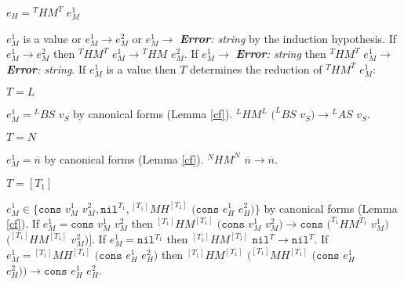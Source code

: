 \begin{case}

$e_{H}={^{T}H}M^{T}$ $e_{M}^{1}$

$e_{M}^{1}$ is a value or $e_{M}^{1}\rightarrow e_{M}^{2}$ or $e_{M}^{1}\rightarrow$ \emph{\textbf{Error}: string} by the induction hypothesis.  If $e_{M}^{1}\rightarrow e_{M}^{2}$ then $^{T}HM^{T}$ $e_{M}^{1}\rightarrow{^{T}H}M$ $e_{M}^{2}$.  If $e_{M}^{1}\rightarrow$ \emph{\textbf{Error}: string} then $^{T}HM^{T}$ $e_{M}^{1}\rightarrow$ \emph{\textbf{Error}: string}.  If $e_{M}^{1}$ is a value then $T$ determines the reduction of $^{T}HM^{T}$ $e_{M}^{1}$:

\begin{subcase}

$T=L$

$e_{M}^{1}={^{L}B}S$ $v_{S}$ by canonical forms (Lemma \ref{cf}).  $^{L}HM^{L}$ $(^{L}BS$ $v_{S})\rightarrow{^{L}A}S$ $v_{S}$.

\end{subcase}

\begin{subcase}

$T=N$

$e_{M}^{1}=\overline{n}$ by canonical forms (Lemma \ref{cf}).  $^{N}HM^{N}$ $\overline{n}\rightarrow\overline{n}$.

\end{subcase}

\begin{subcase}

$T=[T_{1}]$

$e_{M}^{1}\in\lbrace\mathtt{cons}$ $v_{M}^{1}$ $v_{M}^{2},\mathtt{nil}^{T_{1}},{^{[T_{1}]}M}H^{[T_{1}]}$ $(\mathtt{cons}$ $e_{H}^{1}$ $e_{H}^{2})\rbrace$ by canonical forms (Lemma \ref{cf}).  If $e_{M}^{1}=\mathtt{cons}$ $v_{M}^{1}$ $v_{M}^{2}$ then $^{[T_{1}]}HM^{[T_{1}]}$ $(\mathtt{cons}$ $v_{M}^{1}$ $v_{M}^{2})\rightarrow\mathtt{cons}$ $(^{T_{1}}HM^{T_{1}}$ $v_{M}^{1})$ $(^{[T_{1}]}HM^{[T_{1}]}$ $v_{M}^{2})]$.  If $e_{M}^{1}=\mathtt{nil}^{T_{1}}$ then $^{[T_{1}]}HM^{[T_{1}]}$ $\mathtt{nil}^{T}\rightarrow\mathtt{nil}^{T}$.  If $e_{M}^{1}={^{[T_{1}]}M}H^{[T_{1}]}$ $(\mathtt{cons}$ $e_{H}^{1}$ $e_{H}^{2})$ then $^{[T_{1}]}HM^{[T_{1}]}$ $(^{[T_{1}]}MH^{[T_{1}]}$ $(\mathtt{cons}$ $e_{H}^{1}$ $e_{H}^{2}))\rightarrow\mathtt{cons}$ $e_{H}^{1}$ $e_{H}^{2}$.

\end{subcase}

\begin{subcase}


\end{subcase}
\end{case}

